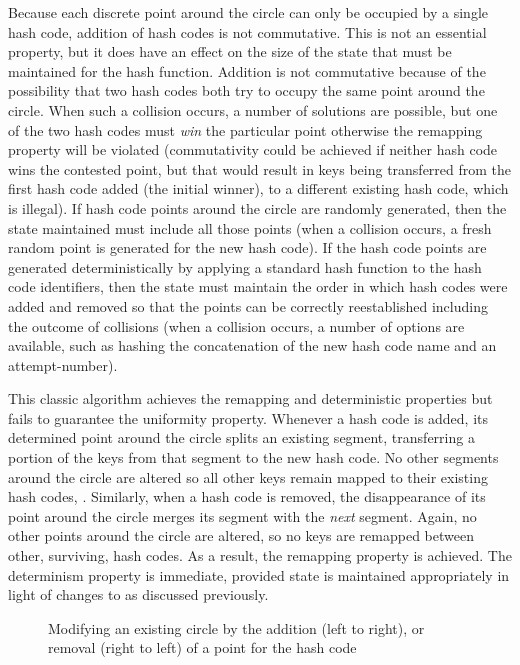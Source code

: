 \documentclass[runningheads,a4paper]{llncs}
\begin{document}
Because each discrete point around the circle can only be occupied by
a single hash code, addition of hash codes is not commutative. This is
not an essential property, but it does have an effect on the size of
the state that must be maintained for the hash function. Addition is
not commutative because of the possibility that two hash codes both
try to occupy the same point around the circle. When such a collision
occurs, a number of solutions are possible, but one of the two hash
codes must {\em win} the particular point otherwise the remapping
property will be violated (commutativity could be achieved if neither
hash code wins the contested point, but that would result in keys
being transferred from the first hash code added (the initial winner),
to a different existing hash code, which is illegal). If hash code
points around the circle are randomly generated, then the state
maintained must include all those points (when a collision occurs, a
fresh random point is generated for the new hash code). If the hash
code points are generated deterministically by applying a standard
hash function to the hash code identifiers, then the state must
maintain the order in which hash codes were added and removed so that
the points can be correctly reestablished including the outcome of
collisions (when a collision occurs, a number of options are
available, such as hashing the concatenation of the new hash code name
and an attempt-number).

This classic algorithm achieves the remapping and deterministic
properties but fails to guarantee the uniformity property. Whenever a
hash code is added, its determined point around the circle splits an
existing segment, transferring a portion of the keys from that segment
to the new hash code. No other segments around the circle are altered
so all other keys remain mapped to their existing hash codes,
. Similarly, when a hash code is removed,
the disappearance of its point around the circle merges its segment
with the {\em next} segment. Again, no other points around the circle
are altered, so no keys are remapped between other, surviving, hash
codes. As a result, the remapping property is achieved. The
determinism property is immediate, provided state is maintained
appropriately in light of changes to  as discussed previously.

\begin{figure}
\begin{center}

\end{center}
\caption{Modifying an existing circle by the addition (left to right),
  or removal (right to left) of a point for the hash code }
\label{fig:circle-simple-add}
\end{figure}
\end{document}
